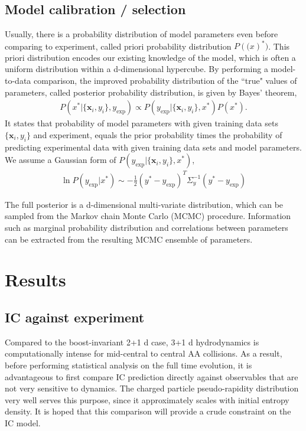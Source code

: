 \documentclass[aps,prl,twocolumn,groupedaddress]{revtex4-1}
\begin{document}
	\subsection{Model calibration / selection}
	Usually, there is a probability distribution of model parameters even before comparing  to experiment, called priori probability distribution $P(\mathbf(x)^*)$. 
	This priori distribution encodes our existing knowledge of the model, which is often a uniform distribution within a d-dimensional hypercube. 
	By performing a model-to-data comparison, the improved probability distribution of the ``true" values of parameters, called posterior probability distribution, is given by Bayes' theorem,
	\begin{eqnarray}
		P(x^*|\{\mathbf{x}_i, y_i\}, y_\textrm{exp}) \propto P(y_\textrm{exp}|\{\mathbf{x}_i, y_i\}, x^*) P(x^*).
	\end{eqnarray}
	It states that probability of model parameters with given training data sets $\{\mathbf{x}_i, y_i\}$ and experiment, equals the prior probability times the probability of predicting experimental data with given training data sets and model parameters.
	We assume a Gaussian form of $P(y_\textrm{exp}|\{\mathbf{x}_i, y_i\}, x^*)$,
	\begin{eqnarray}
	\ln P(y_\textrm{exp}|x^*) \sim -\frac{1}{2}(y^* - y_\textrm{exp})^T\Sigma_y^{-1}(y^* - y_\textrm{exp})
	\end{eqnarray}
	
	The full posterior is a d-dimensional multi-variate distribution, which can be sampled from the Markov chain Monte Carlo (MCMC) procedure. 
	Information such as marginal probability distribution and correlations between parameters can be extracted from the resulting MCMC ensemble of parameters.
	
\section{Results}
	\subsection{IC against experiment}
	Compared to the boost-invariant 2+1 d case, 3+1 d hydrodynamics is computationally intense for mid-central to central AA collisions. 
	As a result, before performing statistical analysis on the full time evolution, it is advantageous to first compare IC prediction directly against observables that are not very sensitive to dynamics. 
	The charged particle pseudo-rapidity distribution very well serves this purpose, since it approximately scales with initial entropy density.
	It is hoped that this comparison will provide a crude constraint on the IC model.
	
\end{document}
